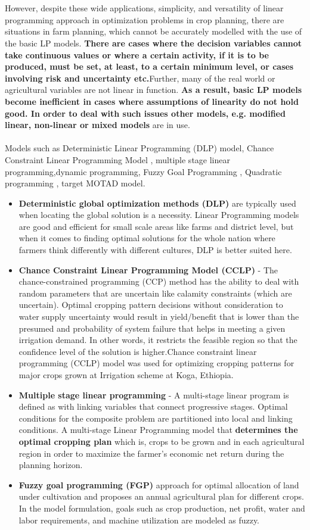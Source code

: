 \documentclass[conference]{IEEEtran}
\begin{document}
\\\\
However, despite these wide applications, simplicity, and versatility of linear programming approach in optimization problems in crop planning, there are situations in farm planning, which cannot be accurately modelled with the use of the basic LP models. \textbf{There are cases where the decision variables cannot take continuous values or where a certain activity, if it is to be produced, must be set, at least, to a certain minimum level, or cases involving risk and uncertainty etc.}Further, many of the real world or agricultural variables are not linear in function. \textbf{As a result, basic LP models become inefficient in cases where assumptions of linearity do not hold good. In order to deal with such issues other models, e.g. modified linear, non-linear or mixed models} are in use.
\\\\
Models such as Deterministic Linear Programming (DLP) model, Chance Constraint Linear Programming Model , multiple stage linear programming,dynamic programming, Fuzzy Goal Programming , Quadratic programming , target MOTAD model.
\begin{itemize}
    \item	\textbf{Deterministic global optimization methods (DLP)} are typically used when locating the global solution is a necessity. Linear Programming models are good and efficient for small scale areas like farms and district level, but when it comes to finding optimal solutions for the whole nation where farmers think differently with different cultures, DLP is better suited here.
    \item \textbf{Chance Constraint Linear Programming Model (CCLP)} - The chance-constrained programming (CCP) method has the ability to deal with random parameters that are uncertain like calamity constraints (which are uncertain). Optimal cropping pattern decisions without consideration to water supply uncertainty would result in yield/benefit that is lower than the presumed and probability of system failure that helps in meeting a given irrigation demand. In other words, it restricts the feasible region so that the confidence level of the solution is higher.Chance constraint linear programming (CCLP) model was used for optimizing cropping patterns for major crops grown at Irrigation scheme at Koga, Ethiopia.
    \item \textbf{Multiple stage linear programming} - A multi-stage linear program is defined as with linking variables that connect progressive stages. Optimal conditions for the composite problem are partitioned into local and linking conditions. A multi-stage Linear Programming model that \textbf{determines the optimal cropping plan} which is, crops to be grown and in each agricultural region in order to maximize the farmer's economic net return during the planning horizon.
    \item \textbf{Fuzzy goal programming (FGP)} approach for optimal allocation of land under cultivation and proposes an annual agricultural plan for different crops. In the model formulation, goals such as crop production, net profit, water and labor requirements, and machine utilization are modeled as fuzzy. 
\end{itemize}
\end{document}
